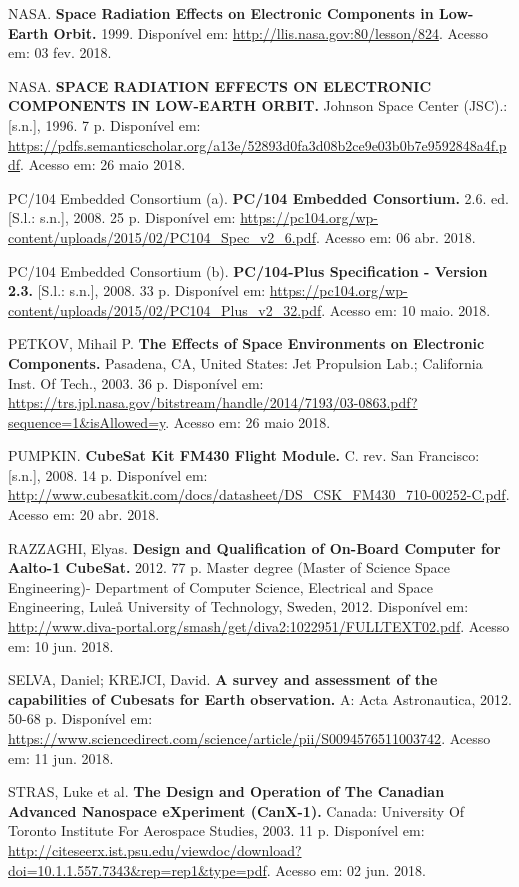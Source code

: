 \noindent NASA. \textbf{Space Radiation Effects on Electronic Components in Low-Earth Orbit. } 1999. Disponível em: \url{http://llis.nasa.gov:80/lesson/824}. Acesso em: 03 fev. 2018.

\noindent NASA. \textbf{SPACE RADIATION EFFECTS ON ELECTRONIC COMPONENTS IN LOW-EARTH ORBIT. } Johnson Space Center (JSC).: [s.n.], 1996. 7 p. Disponível em: \url{https://pdfs.semanticscholar.org/a13e/52893d0fa3d08b2ce9e03b0b7e9592848a4f.pdf}. Acesso em: 26 maio 2018.

\noindent PC/104 Embedded Consortium (a). \textbf{PC/104 Embedded Consortium. }2.6. ed. [S.l.: s.n.], 2008. 25 p. Disponível em: \url{https://pc104.org/wp-content/uploads/2015/02/PC104_Spec_v2_6.pdf}. Acesso em: 06 abr. 2018.

\noindent PC/104 Embedded Consortium (b). \textbf{PC/104-Plus Specification - Version 2.3. } [S.l.: s.n.], 2008. 33 p. Disponível em: \url{https://pc104.org/wp-content/uploads/2015/02/PC104_Plus_v2_32.pdf}. Acesso em: 10 maio. 2018.

\noindent PETKOV, Mihail P. \textbf{The Effects of Space Environments on Electronic Components. } Pasadena, CA, United States: Jet Propulsion Lab.; California Inst. Of Tech., 2003. 36 p. Disponível em: \url{https://trs.jpl.nasa.gov/bitstream/handle/2014/7193/03-0863.pdf?sequence=1&isAllowed=y}. Acesso em: 26 maio 2018.

\noindent PUMPKIN. \textbf{CubeSat Kit FM430 Flight Module.} C. rev. San Francisco: [s.n.], 2008. 14 p. Disponível em: \url{http://www.cubesatkit.com/docs/datasheet/DS_CSK_FM430_710-00252-C.pdf}. Acesso em: 20 abr. 2018.

\noindent RAZZAGHI, Elyas. \textbf{Design and Qualification of On-Board Computer for Aalto-1 CubeSat.} 2012. 77 p. Master degree (Master of Science Space Engineering)- Department of Computer Science, Electrical and Space Engineering, Luleå University of Technology, Sweden, 2012. Disponível em: \url{http://www.diva-portal.org/smash/get/diva2:1022951/FULLTEXT02.pdf}. Acesso em: 10 jun. 2018.

\noindent SELVA, Daniel; KREJCI, David. \textbf{A survey and assessment of the capabilities of Cubesats for Earth observation. } A: Acta Astronautica, 2012. 50-68 p. Disponível em: \url{https://www.sciencedirect.com/science/article/pii/S0094576511003742}. Acesso em: 11 jun. 2018.

\noindent STRAS, Luke et al. \textbf{The Design and Operation of The Canadian Advanced Nanospace eXperiment (CanX-1). } Canada: University Of Toronto Institute For Aerospace Studies, 2003. 11 p. Disponível em: \url{http://citeseerx.ist.psu.edu/viewdoc/download?doi=10.1.1.557.7343\&rep=rep1\&type=pdf}. Acesso em: 02 jun. 2018.

